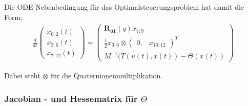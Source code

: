 \documentclass[12pt, a4paper]{scrartcl}
\begin{document}
Die ODE-Nebenbedingung für das Optimalsteuerungsproblem hat damit die Form:
\begin{align}
\frac{d}{dt} 
  \left(
      \begin{matrix}
          x_{0:2}(t) \\
          x_{3:6}(t) \\
          x_{7:12}(t)  
      \end{matrix}
  \right)
  = 
  \left(
      \begin{matrix}
          \mathbf{R_{01}}(q)x_{7:9} \\
          \frac{1}{2} x_{3:6} \otimes \left(\begin{matrix} 0, & x_{10:12} \end{matrix}\right)^T\\
          M^{-1} (T(u(t), x(t)) - \Theta(x(t))
      \end{matrix}
  \right)
\end{align}

Dabei steht $ \otimes $ für die Quaternionenmultiplikation. 

\subsubsection{Jacobian - und Hessematrix für $\Theta$}
\end{document}
